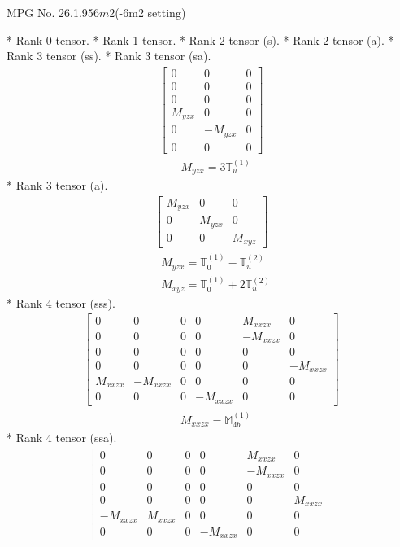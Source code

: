 \documentclass[fleqn,8pt,landscape]{jsarticle}
\begin{document}
\setcounter{MaxMatrixCols}{32}

\renewcommand{\tablename}{Table~}
\renewcommand{\figurename}{Figure~}
\begin{center}
\LARGE
MPG No. 26.1.95\quad$\bar{6}m2$\quad(-6m2 setting)
\end{center}
* Rank 0 tensor.
* Rank 1 tensor.
* Rank 2 tensor (s).
* Rank 2 tensor (a).
* Rank 3 tensor (ss).
* Rank 3 tensor (sa).
\begin{align*}
\begin{bmatrix} 0 & 0 & 0 \\ 0 & 0 & 0 \\ 0 & 0 & 0 \\ M_{yzx} & 0 & 0 \\ 0 & - M_{yzx} & 0 \\ 0 & 0 & 0 \end{bmatrix}
\end{align*}
\begin{align*}
& M_{yzx} = 3 \mathbb{T}_{u}^{(1)}
\end{align*}
* Rank 3 tensor (a).
\begin{align*}
\begin{bmatrix} M_{yzx} & 0 & 0 \\ 0 & M_{yzx} & 0 \\ 0 & 0 & M_{xyz} \end{bmatrix}
\end{align*}
\begin{align*}
& M_{yzx} = \mathbb{T}_{0}^{(1)} - \mathbb{T}_{u}^{(2)} \\
& M_{xyz} = \mathbb{T}_{0}^{(1)} + 2 \mathbb{T}_{u}^{(2)}
\end{align*}
* Rank 4 tensor (sss).
\begin{align*}
\begin{bmatrix} 0 & 0 & 0 & 0 & M_{xxzx} & 0 \\ 0 & 0 & 0 & 0 & - M_{xxzx} & 0 \\ 0 & 0 & 0 & 0 & 0 & 0 \\ 0 & 0 & 0 & 0 & 0 & - M_{xxzx} \\ M_{xxzx} & - M_{xxzx} & 0 & 0 & 0 & 0 \\ 0 & 0 & 0 & - M_{xxzx} & 0 & 0 \end{bmatrix}
\end{align*}
\begin{align*}
& M_{xxzx} = \mathbb{M}_{4b}^{(1)}
\end{align*}
* Rank 4 tensor (ssa).
\begin{align*}
\begin{bmatrix} 0 & 0 & 0 & 0 & M_{xxzx} & 0 \\ 0 & 0 & 0 & 0 & - M_{xxzx} & 0 \\ 0 & 0 & 0 & 0 & 0 & 0 \\ 0 & 0 & 0 & 0 & 0 & M_{xxzx} \\ - M_{xxzx} & M_{xxzx} & 0 & 0 & 0 & 0 \\ 0 & 0 & 0 & - M_{xxzx} & 0 & 0 \end{bmatrix}
\end{align*}
\end{document}
